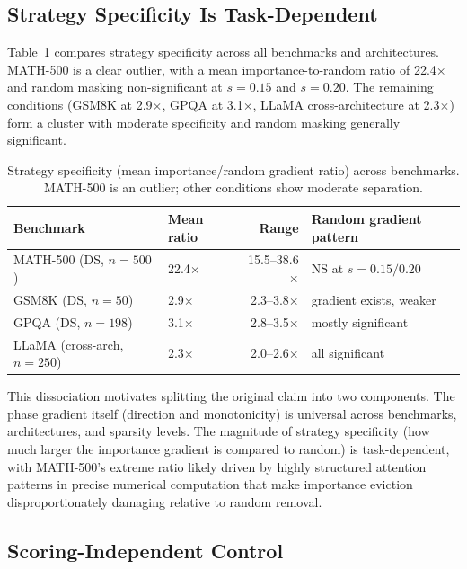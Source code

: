 \documentclass[11pt,a4paper]{article}
\begin{document}
\subsection{Strategy Specificity Is Task-Dependent}\label{sec:task-dependent}

Table~\ref{tab:specificity-all} compares strategy specificity across all benchmarks and architectures. MATH-500 is a clear outlier, with a mean importance-to-random ratio of 22.4$\times$ and random masking non-significant at $s{=}0.15$ and $s{=}0.20$. The remaining conditions (GSM8K at 2.9$\times$, GPQA at 3.1$\times$, LLaMA cross-architecture at 2.3$\times$) form a cluster with moderate specificity and random masking generally significant.

\begin{table}[t]
\centering
\caption{Strategy specificity (mean importance/random gradient ratio) across benchmarks. MATH-500 is an outlier; other conditions show moderate separation.}
\label{tab:specificity-all}
\small
\begin{tabular}{llrl}
\toprule
Benchmark & Mean ratio & Range & Random gradient pattern \\
\midrule
MATH-500 (DS, $n{=}500$) & 22.4$\times$ & 15.5--38.6$\times$ & NS at $s{=}0.15/0.20$ \\
GSM8K (DS, $n{=}50$) & 2.9$\times$ & 2.3--3.8$\times$ & gradient exists, weaker \\
GPQA (DS, $n{=}198$) & 3.1$\times$ & 2.8--3.5$\times$ & mostly significant \\
LLaMA (cross-arch, $n{=}250$) & 2.3$\times$ & 2.0--2.6$\times$ & all significant \\
\bottomrule
\end{tabular}
\end{table}

This dissociation motivates splitting the original claim into two components. The phase gradient itself (direction and monotonicity) is universal across benchmarks, architectures, and sparsity levels. The magnitude of strategy specificity (how much larger the importance gradient is compared to random) is task-dependent, with MATH-500's extreme ratio likely driven by highly structured attention patterns in precise numerical computation that make importance eviction disproportionately damaging relative to random removal.

\subsection{Scoring-Independent Control}\label{sec:recency}
\end{document}
